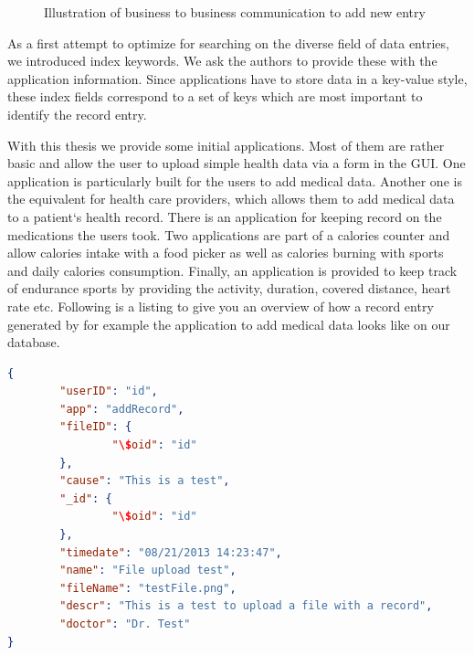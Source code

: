 \begin{figure}[h]
%
\caption{Illustration of business to business communication to add new entry}
\label{fig:b2b}
\end{figure} 

As a first attempt to optimize for searching on the diverse field of data entries, we introduced index keywords. We ask the authors to provide these with the application information. Since applications have to store data in a key-value style, these index fields correspond to a set of keys which are most important to identify the record entry.

With this thesis we provide some initial applications. Most of them are rather basic and allow the user to upload simple health data via a form in the GUI. One application is particularly built for the users to add medical data. Another one is the equivalent for health care providers, which allows them to add medical data to a patient`s health record. There is an application for keeping record on the medications the users took. Two applications are part of a calories counter and allow calories intake with a food picker as well as calories burning with sports and daily calories consumption. Finally, an application is provided to keep track of endurance sports by providing the activity, duration, covered distance, heart rate etc.\newline
Following is a listing to give you an overview of how a record entry generated by for example the application to add medical data looks like on our database.

\begin{lstlisting}[language=json,firstnumber=1]
{
		"userID": "id",
		"app": "addRecord",
		"fileID": {
				"\$oid": "id"
		},
		"cause": "This is a test",
		"_id": {
				"\$oid": "id"
		},
		"timedate": "08/21/2013 14:23:47",
		"name": "File upload test",
		"fileName": "testFile.png",
		"descr": "This is a test to upload a file with a record",
		"doctor": "Dr. Test"
}
\end{lstlisting}


